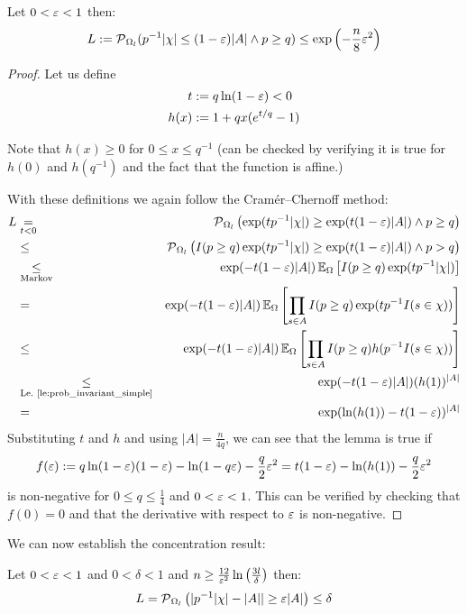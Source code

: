 \begin{lemma}\label{le:lower_tail}
Let $0 < \varepsilon < 1$ then:
\[
  L := \operatorname{\mathcal P}_{\Omega_l} ( p^{-1} |\chi| \leq (1-\varepsilon)|A| \wedge p \geq q) \leq
    \exp\left(-\frac{n}{8} \varepsilon^2\right)
\]
\end{lemma}
\begin{proof}
Let us define
\begin{align*}
  t & := q \ln(1-\varepsilon) < 0 \\
  h(x) & := 1+q x (e^{t/q}-1)
\end{align*}

Note that $h(x) \geq 0$ for $0 \leq x \leq q^{-1}$ (can be checked by verifying it is true for
$h(0)$ and $h(q^{-1})$ and the fact that the function is affine.)

With these definitions we again follow the Cram\'{e}r--Chernoff method:
{\allowdisplaybreaks
\begin{eqnarray*}
  L & \underset{t<0}{=} & \operatorname{\mathcal P}_{\Omega_l} \left( \exp(t p^{-1} |\chi|) \geq
    \exp(t (1-\varepsilon)|A|) \wedge p \geq q \right) \\
    & \leq & \operatorname{\mathcal P}_{\Omega_l} \left( I(p \geq q) \exp(t p^{-1} |\chi|) \geq
    \exp(t (1-\varepsilon)|A|) \wedge p > q \right) \\
    & \underset{\textrm{Markov}}{\leq} & \exp( -t (1-\varepsilon) |A| )
    \operatorname{\mathbb E}_\Omega \left[ I(p \geq q) \exp ( t p^{-1} |\chi| ) \right] \\
    & = & \exp( -t (1-\varepsilon) |A| ) \operatorname{\mathbb E}_\Omega \left[ \prod_{s \in A} I(p \geq q)
      \exp ( t p^{-1} I(s \in \chi) ) \right] \\
    & \leq & \exp( -t (1-\varepsilon) |A| ) \operatorname{\mathbb E}_\Omega
      \left[ \prod_{s \in A} I(p \geq q) h( p^{-1} I(s \in \chi) ) \right] \\
    & \underset{\textrm{Le.~\ref{le:prob_invariant_simple}}}{\leq} & \exp( -t (1-\varepsilon) |A| ) (h(1))^{|A|} \\
    & = & \exp( \ln(h(1)) -t (1-\varepsilon) )^{|A|}
\end{eqnarray*}
}
Substituting $t$ and $h$ and using $|A| = \frac{n}{4q}$, we can see that the lemma is true if
\[
  f(\varepsilon) := q \ln(1-\varepsilon) (1-\varepsilon) -\ln(1 - q \varepsilon) - \frac{q}{2}\varepsilon^2 =
  t (1-\varepsilon) - \ln(h(1)) - \frac{q}{2} \varepsilon^2
\]
is non-negative for $0 \leq q \leq \frac{1}{4}$ and $0 < \varepsilon < 1$.
This can be verified by checking that $f(0) = 0$ and that the derivative with respect to $\varepsilon$ is
non-negative.
\end{proof}
We can now establish the concentration result:
\begin{theorem}\label{th:concentration}
Let $0 < \varepsilon < 1$ and $0 < \delta < 1$ and
$n \geq \frac{12}{\varepsilon^2} \ln\left(\frac{3l}{\delta}\right)$ then:
\[
  L = \operatorname{\mathcal P}_{\Omega_l} \left( | p^{-1} |\chi| - |A| | \geq \varepsilon |A| \right) \leq \delta
\]
\end{theorem}
